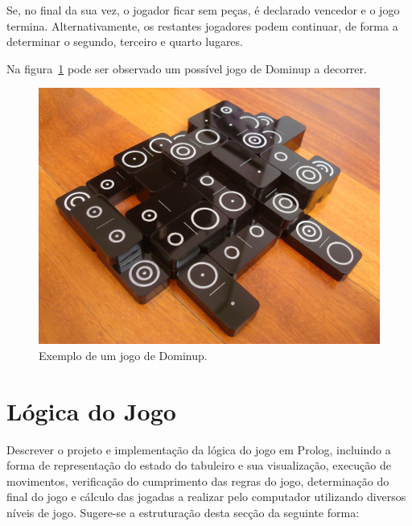 \documentclass[a4paper]{article}
\begin{document}
Se, no final da sua vez, o jogador ficar sem peças, é declarado vencedor e o jogo termina. Alternativamente, os restantes jogadores podem continuar, de forma a determinar o segundo, terceiro e quarto lugares.

Na figura~\ref{example} pode ser observado um possível jogo de Dominup a decorrer.

\begin{figure}[htbp]
\begin{center}
\includegraphics[scale=0.4]{example.jpg}
\caption{Exemplo de um jogo de Dominup.}
\label{example}
\end{center}
\end{figure}



\section{Lógica do Jogo}

Descrever o projeto e implementação da lógica do jogo em Prolog, incluindo a forma de representação do estado do tabuleiro e sua visualização, execução de movimentos, verificação do cumprimento das regras do jogo, determinação do final do jogo e cálculo das jogadas a realizar pelo computador utilizando diversos níveis de jogo. Sugere-se a estruturação desta secção da seguinte forma:
\end{document}

